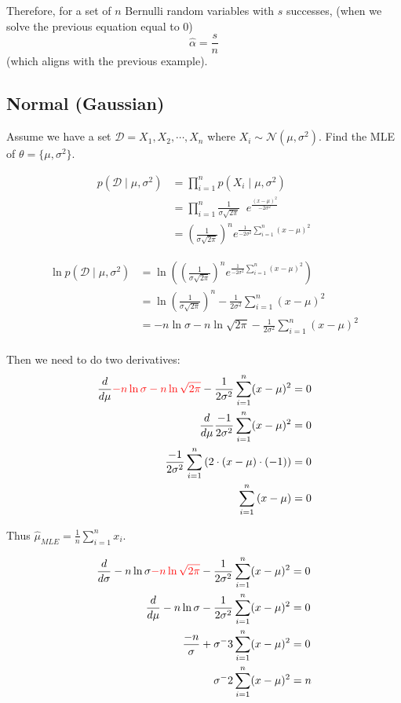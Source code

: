 Therefore, for a set of $n$ Bernulli random variables with $s$ successes, (when we solve the previous equation equal to 0) 
\[\hat\alpha = \frac{s}{n}\]
(which aligns with the previous example). 

\subsection{Normal (Gaussian)}
Assume we have a set $\mathcal{D} = X_1, X_2, \cdots, X_n$ 
where $X_i \sim \mathcal{N}(\mu, \sigma^2)$.
Find the MLE of $\theta = \{\mu,\sigma^2\}$.

\begin{align*}
p(\mathcal{D}\mid\mu,\sigma^2) & = \prod_{i=1}^n p(X_i\mid\mu,\sigma^2)\\
						& = \prod_{i=1}^n \frac{1}{\sigma\sqrt{2\pi}}\;\;e^{\frac{(x-\mu)^2}{-2\sigma^2}}\\
						& = \left( \frac{1}{\sigma\sqrt{2\pi}}\right)^n e^{\frac{1}{-2\sigma^2}\sum_{i=1}^n (x-\mu)^2}		     
\end{align*}

\begin{align*}
\ln p(\mathcal{D}\mid\mu,\sigma^2) 
						& = \ln \left(\left( \frac{1}{\sigma\sqrt{2\pi}}\right)^n e^{\frac{1}{-2\sigma^2}\sum_{i=1}^n (x-\mu)^2}\right)	\\
						& = \ln \left( \frac{1}{\sigma\sqrt{2\pi}}\right)^n - \frac{1}{2\sigma^2}\sum_{i=1}^n (x-\mu)^2	\\	
						& = -n \ln \sigma - n \ln \sqrt{2\pi} - \frac{1}{2\sigma^2}\sum_{i=1}^n (x-\mu)^2	\\	     
\end{align*}

Then we need to do two derivatives: 
\begin{align*}
\frac{d}{d\mu} {\color{red}-n \ln \sigma - n \ln \sqrt{2\pi} }- \frac{1}{2\sigma^2}\sum_{i=1}^n (x-\mu)^2 &= 0\\
\frac{d}{d\mu} \frac{-1}{2\sigma^2}\sum_{i=1}^n (x-\mu)^2 &= 0\\
\frac{-1}{2\sigma^2}\sum_{i=1}^n \left(2\cdot(x-\mu)\cdot(-1)\right) &= 0\\
\sum_{i=1}^n \left(x-\mu\right) &= 0\\
\end{align*}

Thus $\displaystyle\hat\mu_{MLE} = \frac{1}{n}\sum_{i=1}^n x_i$. 

\begin{align*}
\frac{d}{d\sigma} -n \ln \sigma {\color{red}- n \ln \sqrt{2\pi} }- \frac{1}{2\sigma^2}\sum_{i=1}^n (x-\mu)^2 &= 0\\
\frac{d}{d\mu} -n \ln \sigma - \frac{1}{2\sigma^2}\sum_{i=1}^n (x-\mu)^2&= 0\\
\frac{-n}{\sigma} + \sigma^-3\sum_{i=1}^n (x-\mu)^2 &= 0\\
\sigma^-2\sum_{i=1}^n (x-\mu)^2 &= n\\
\end{align*}

